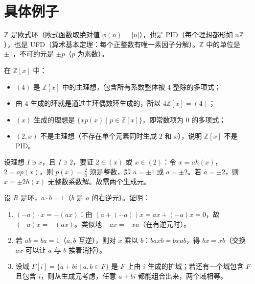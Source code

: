 \section{具体例子}

\begin{example}
$\mathbb{Z}$ 是欧式环（欧式函数取绝对值 $\phi(n) = |n|$），也是 PID（每个理想都形如 $n\mathbb{Z}$），也是 UFD（算术基本定理：每个正整数有唯一素因子分解）。$\mathbb{Z}$ 中的单位是 $\pm 1$，不可约元是 $\pm p$（$p$ 为素数）。
\end{example}


\begin{example}[多项式环中的主理想]
在 $[x]$ 中：
\begin{itemize}
  \item $(4)$ 是 $[x]$ 中的主理想，包含所有系数整体被 $4$ 整除的多项式；
  \item 由 $4$ 生成的环就是通过主环偶数环生成的，所以 $4[x] = (4)$；
  \item $(x)$ 生成的理想是 $\{xp(x) \mid p \in {}[x]\}$，即常数项为 $0$ 的多项式；
  \item $(2, x)$ 不是主理想（不存在单个元素同时生成 $2$ 和 $x$），说明 $[x]$ 不是 PID。
\end{itemize}

设理想 $I \ni x$，且 $I $，要证 $2 \in (x)$ 或 $x \in (2)$：令 $x = ah(x)$，$2 = ap(x)$，则 $p(x) = $ 须是整数，即 $a = $ 或 $a = $。若 $a = $，则 $x = \pm 2h(x)$ 无整数系数解。故需两个生成元。
\end{example}

\begin{example}[例 3.5 作业：逆元与交换性]
设 $R$ 是环，$a \cdot b = 1$（$b$ 是 $a$ 的右逆元）。证明：
\begin{enumerate}
  \item $(-a) \cdot x = -(ax)$：由 $(a + (-a))x = ax + (-a)x = 0$，故 $(-a)x = -(ax)$。类似地 $-ax = -xa$（在有逆元时）。
  \item 若 $ab = ba = 1$（$a, b$ 互逆），则对 $x$ 乘以 $b$：$baxb = bxab$，得 $bx = xb$（交换 $ax$ 可以让 $a$ 与 $b$ 挨着消掉）。
  \item 设域 $F[i] = \{a + bi \mid a, b \in F\}$ 是 $F$ 上由 $i$ 生成的扩域；若还有一个域包含 $F$ 且包含 $i$，则从生成元考虑，任意 $a + bi$ 都能组合出来，两个域相等。
\end{enumerate}
\end{example}

